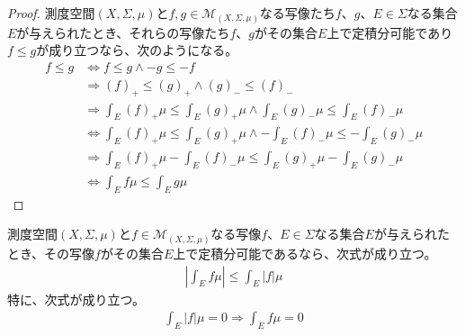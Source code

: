 \documentclass[dvipdfmx]{jsarticle}
\begin{document}
\begin{proof}
測度空間$(X,\varSigma,\mu)$と$f,g \in \mathcal{M}_{(X,\varSigma,\mu)}$なる写像たち$f$、$g$、$E \in \varSigma$なる集合$E$が与えられたとき、それらの写像たち$f$、$g$がその集合$E$上で定積分可能であり$f \leq g$が成り立つなら、次のようになる。
\begin{align*}
f \leq g &\Leftrightarrow f \leq g \land - g \leq - f\\
&\Rightarrow (f)_{+} \leq (g)_{+} \land (g)_{-} \leq (f)_{-}\\
&\Rightarrow \int_{E} {(f)_{+}\mu} \leq \int_{E} {(g)_{+}\mu} \land \int_{E} {(g)_{-}\mu} \leq \int_{E} {(f)_{-}\mu}\\
&\Leftrightarrow \int_{E} {(f)_{+}\mu} \leq \int_{E} {(g)_{+}\mu} \land - \int_{E} {(f)_{-}\mu} \leq - \int_{E} {(g)_{-}\mu}\\
&\Rightarrow \int_{E} {(f)_{+}\mu} - \int_{E} {(f)_{-}\mu} \leq \int_{E} {(g)_{+}\mu} - \int_{E} {(g)_{-}\mu}\\
&\Leftrightarrow \int_{E} {f\mu} \leq \int_{E} {g\mu}
\end{align*}
\end{proof}
\begin{thm}\label{4.6.1.18}
測度空間$(X,\varSigma,\mu)$と$f \in \mathcal{M}_{(X,\varSigma,\mu)}$なる写像$f$、$E \in \varSigma$なる集合$E$が与えられたとき、その写像$f$がその集合$E$上で定積分可能であるなら、次式が成り立つ。
\begin{align*}
\left| \int_{E} {f\mu} \right| \leq \int_{E} {|f|\mu}
\end{align*}
特に、次式が成り立つ。
\begin{align*}
\int_{E} {|f|\mu} = 0 \Rightarrow \int_{E} {f\mu} = 0
\end{align*}
\end{thm}
\end{document}
